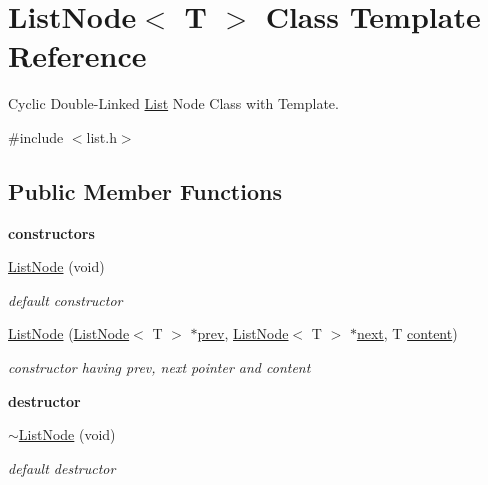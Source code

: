 \hypertarget{class_list_node}{\section{List\-Node$<$ T $>$ Class Template Reference}
\label{class_list_node}
}


Cyclic Double-\/\-Linked \hyperlink{class_list}{List} Node Class with Template.  




{\ttfamily \#include $<$list.\-h$>$}

\subsection*{Public Member Functions}
\begin{Indent}{\bf constructors}\par
\begin{DoxyCompactItemize}
\item 
\hyperlink{class_list_node_aac1e644aa589ef05c6dabeadfdd325f7}{List\-Node} (void)
\begin{DoxyCompactList}\small\item\em default constructor \end{DoxyCompactList}\item 
\hyperlink{class_list_node_a7fb4d8d322f3c55bfd0dc5f1eac435e4}{List\-Node} (\hyperlink{class_list_node}{List\-Node}$<$ T $>$ $\ast$\hyperlink{class_list_node_a997ca532d810ebd030726ff880ba76b5}{prev}, \hyperlink{class_list_node}{List\-Node}$<$ T $>$ $\ast$\hyperlink{class_list_node_a97909c9598053ffd24b77ec715f745f1}{next}, T \hyperlink{class_list_node_a75aabe0bfbeace74391ab20546454e05}{content})
\begin{DoxyCompactList}\small\item\em constructor having prev, next pointer and content \end{DoxyCompactList}\end{DoxyCompactItemize}
\end{Indent}
\begin{Indent}{\bf destructor}\par
\begin{DoxyCompactItemize}
\item 
\hyperlink{class_list_node_a63111deefbeeb3975c8d045a1e4be5b4}{$\sim$\-List\-Node} (void)
\begin{DoxyCompactList}\small\item\em default destructor \end{DoxyCompactList}\end{DoxyCompactItemize}
\end{Indent}
